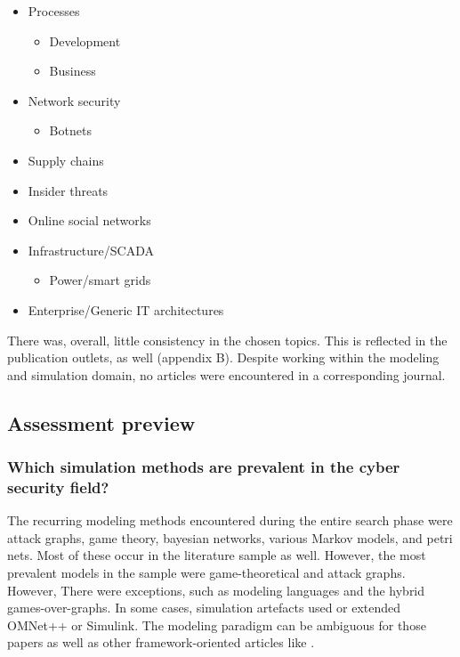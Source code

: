 \documentclass{article}
\begin{document}
\begin{itemize}
    \item Processes
        \begin{itemize}
            \item Development\cite{outkin2019}
            \item Business\cite{tjoa2010}
        \end{itemize}
    \item Network security\cite{durkota2019, angelini2018}
        \begin{itemize}
            \item Botnets\cite{konovalov2013}
        \end{itemize}
    \item Supply chains\cite{polatidis2018}
    \item Insider threats\cite{casey2016}
    \item Online social networks\cite{white2014}
    \item Infrastructure/SCADA\cite{alves2018, ficco2017}
        \begin{itemize}
            \item Power/smart grids\cite{liu2016, zhang2016, queiroz2011, leszczyna2011}
        \end{itemize}
    \item Enterprise/Generic IT architectures\cite{holm2014, pudar2009}
\end{itemize}

\noindent There was, overall, little consistency in the chosen topics. This is reflected in the publication outlets, as well (appendix B). Despite working within the modeling and simulation domain, no articles were encountered in a corresponding journal.

\subsection{Assessment preview}
\subsubsection{Which simulation methods are prevalent in the cyber security field?}

\noindent The recurring modeling methods encountered during the entire search phase were attack graphs, game theory, bayesian networks, various Markov models, and petri nets. Most of these occur in the literature sample as well. However, the most prevalent models in the sample were game-theoretical\cite{durkota2019, casey2016, white2014} and attack graphs\cite{outkin2019, angelini2018, polatidis2018, holm2014}. However, There were exceptions, such as modeling languages\cite{tjoa2010, holm2014} and the hybrid games-over-graphs\cite{outkin2019}. In some cases, simulation artefacts used or extended OMNet++\cite{konovalov2013, queiroz2011} or Simulink\cite{tjoa2010}. The modeling paradigm can be ambiguous for those papers as well as other framework-oriented articles like \cite{alves2018}.\\
\end{document}
